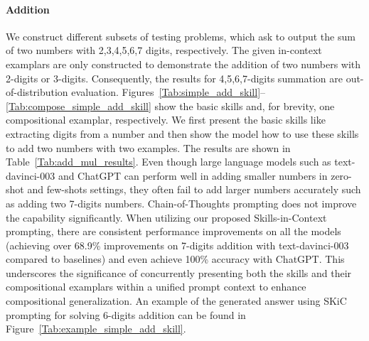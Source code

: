 \documentclass{article} \usepackage{arxiv}
\begin{document}
\paragraph{Addition} We construct different subsets of testing problems, which ask to output the sum of two numbers with 2,3,4,5,6,7 digits, respectively. The given in-context examplars are only constructed to demonstrate the addition of two numbers with 2-digits or 3-digits. Consequently, the results for 4,5,6,7-digits summation are out-of-distribution evaluation. Figures~\ref{Tab:simple_add_skill}--\ref{Tab:compose_simple_add_skill} show the basic skills and, for brevity, one compositional examplar, respectively. We first present the basic skills like extracting digits from a number and then show the model how to use these skills to add two numbers with two examples. The results are shown in Table~\ref{Tab:add_mul_results}. Even though large language models such as text-davinci-003 and ChatGPT can perform well in adding smaller numbers in zero-shot and few-shots settings, they often fail to add larger numbers accurately such as adding two 7-digits numbers. Chain-of-Thoughts prompting does not improve the capability significantly. When utilizing our proposed Skills-in-Context prompting, there are consistent performance improvements on all the models (achieving over 68.9\% improvements on 7-digits addition with text-davinci-003 compared to baselines) and even achieve 100\% accuracy with ChatGPT. This underscores the significance of concurrently presenting both the skills and their compositional examplars within a unified prompt context to enhance compositional generalization. An example of the generated answer using SKiC prompting for solving 6-digits addition can be found in Figure~\ref{Tab:example_simple_add_skill}.
\end{document}
